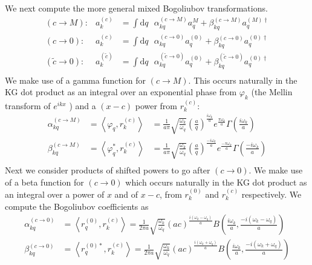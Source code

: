 \documentclass[12pt,a4paper]{article}
\newcommand{\dv}[1]{\mathrm{d} #1 \text{ }}
\begin{document}
We next compute the more general mixed Bogoliubov transformations.
\begin{equation}
  \begin{array}{rll}
  (c \rightarrow M) : & a^{(c)}_k &= \int \dv{q} \alpha^{(c \rightarrow M)}_{kq} a^{M}_q + \beta^{(c \rightarrow M)}_{kq} a^{(M)\dagger}_q \\
  (c \rightarrow 0) : &   a^{(c)}_k &= \int \dv{q} \alpha^{(c \rightarrow 0)}_{kq} a^{(0)}_q + \beta^{(c \rightarrow 0)}_{kq} a^{(0)\dagger}_q \\
  (\widetilde{c} \rightarrow 0) : &   a^{(\tilde{c})}_k &= \int \dv{q} \alpha^{(\widetilde{c} \rightarrow 0)}_{kq} a^{(0)}_q + \beta^{(\widetilde{c} \rightarrow 0)}_{kq} a^{(0)\dagger}_q \\
  \end{array}
\end{equation}
We make use of a gamma function for $(c \rightarrow M)$. This occurs naturally in the KG dot product as an integral over an exponential phase from $\varphi_k$ (the Mellin transform of $e^{ikx}$ \cite{bracewell1966fourier}) and a $(x-c)$ power from $r_k^{(c)}$:
\begin{equation}
  \begin{array}{ccl}
    \alpha^{(c \rightarrow M)}_{kq} &= \left<\varphi_q, r_k^{(c)} \right> &= \frac{1}{a \pi} \sqrt{\frac{\omega_k}{\omega_q}} \left(\frac{a}{q}\right)^{\frac{i\omega_k}{a}} e^{\frac{\pi \omega_k}{a}} \Gamma\left(\frac{i\omega_k}{a}\right) \\
    \beta^{(c \rightarrow M)}_{kq} &= \left<\varphi_q^*, r_k^{(c)} \right> &= \frac{1}{a \pi} \sqrt{\frac{\omega_k}{\omega_q}} \left(\frac{a}{q}\right)^{\frac{-i\omega_k}{a}} e^{\frac{-\pi \omega_k}{a}} \Gamma\left(\frac{-i\omega_k}{a}\right) \\
  \end{array}
  \label{bogoCM}
\end{equation}
Next we consider products of shifted powers to go after $(c \rightarrow 0)$. We make use of a beta function for $(c \rightarrow 0)$ which occurs naturally in the KG dot product as an integral over a power of $x$ and of $x-c$, from $r_k^{(0)}$ and $r_k^{(c)}$ respectively.  We compute the Bogoliubov coefficients as
\begin{equation}
  \begin{aligned}
    \alpha^{(c \rightarrow 0)}_{kq} &= \left<r_q^{(0)}, r_k^{(c)} \right> = \frac{1}{2 \pi a}\sqrt{\frac{\omega_k}{\omega_q}} (ac)^{\frac{i(\omega_k - \omega_q)}{a}} B\left(\frac{i\omega_k}{a}, \frac{-i(\omega_k - \omega_q)}{a}\right) \\
    \beta^{(c \rightarrow 0)}_{kq} &= \left<r_q^{(0)*}, r_k^{(c)} \right> = \frac{1}{2 \pi a}\sqrt{\frac{\omega_k}{\omega_q}} (ac)^{\frac{i(\omega_k + \omega_q)}{a}} B\left(\frac{i\omega_k}{a}, \frac{-i(\omega_k + \omega_q)}{a}\right) \\
  \end{aligned}
  \label{bogoC0}
\end{equation}
\end{document}

